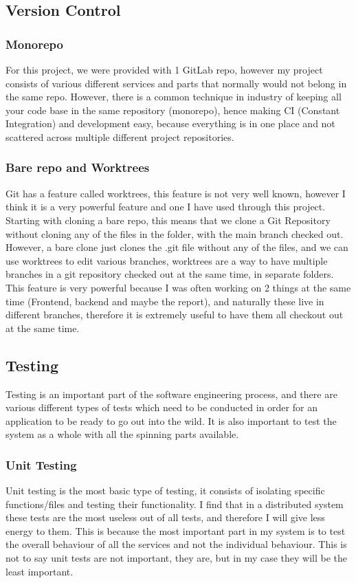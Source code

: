 \documentclass[titlepage]{article}
\begin{document}
\subsection{Version Control}

\subsubsection{Monorepo}
For this project, we were provided with 1 GitLab repo, however my project consists of various different services and parts that normally would not belong in the same repo. However, there is a common technique in industry of keeping all your code base in the same repository (monorepo), hence making CI (Constant Integration) and development easy, because everything is in one place and not scattered across multiple different project repositories. 

\subsubsection{Bare repo and Worktrees}
Git has a feature called worktrees, this feature is not very well known, however I think it is a very powerful feature and one I have used through this project. Starting with cloning a bare repo, this means that we clone a Git Repository without cloning any of the files in the folder, with the main branch checked out. However, a bare clone just clones the .git file without any of the files, and we can use worktrees to edit various branches, worktrees are a way to have multiple branches in a git repository checked out at the same time, in separate folders. This feature is very powerful because I was often working on 2 things at the same time (Frontend, backend and maybe the report), and naturally these live in different branches, therefore it is extremely useful to have them all checkout out at the same time. 

\subsection{Testing}
Testing is an important part of the software engineering process, and there are various different types of tests which need to be conducted in order for an application to be ready to go out into the wild. It is also important to test the system as a whole with all the spinning parts available.

\subsubsection{Unit Testing}
Unit testing is the most basic type of testing, it consists of isolating specific functions/files and testing their functionality. I find that in a distributed system these tests are the most useless out of all tests, and therefore I will give less energy to them. This is because the most important part in my system is to test the overall behaviour of all the services and not the individual behaviour. This is not to say unit tests are not important, they are, but in my case they will be the least important. \\
\end{document}
